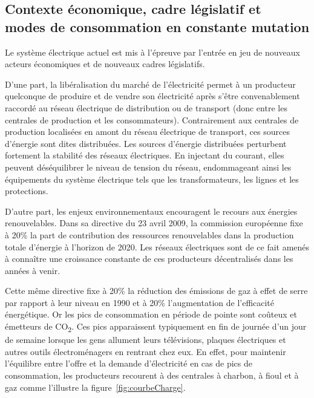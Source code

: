 \subsection{Contexte économique, cadre législatif et\\
modes de consommation en constante mutation}

Le système électrique actuel est mis à l'épreuve par l'entrée en jeu de nouveaux 
acteurs économiques et de nouveaux cadres législatifs. 

D'une part, la libéralisation du marché de l'électricité permet à un producteur 
quelconque de produire et de vendre son électricité après s'être convenablement 
raccordé au réseau électrique de distribution ou de transport (donc entre les 
centrales de production et les consommateurs). Contrairement aux centrales de 
production localisées en amont du réseau électrique de transport, ces sources 
d'énergie sont dites distribuées. Les sources d'énergie distribuées perturbent 
fortement la stabilité des réseaux électriques. En injectant du courant, elles 
peuvent déséquilibrer le niveau de tension du réseau, endommageant ainsi les 
équipements du système électrique tels que les transformateurs, les lignes et 
les protections. 

D'autre part, les enjeux environnementaux encouragent le recours aux énergies 
renouvelables. Dans sa directive du 23 avril 2009, la commission européenne fixe 
à 20\% la part de contribution des ressources renouvelables dans la production 
totale d'énergie à l'horizon de 2020. Les réseaux électriques sont de ce fait 
amenés à connaître une croissance constante de ces producteurs décentralisés 
dans les années à venir.

Cette même directive fixe à 20\% la réduction des émissions de gaz à effet de 
serre par rapport à leur niveau en 1990 et à 20\% l'augmentation de l'efficacité 
énergétique. Or les pics de consommation en période de pointe sont coûteux et 
émetteurs de CO\textsubscript{2}. Ces pics apparaissent typiquement en fin de journée d'un 
jour de semaine lorsque les gens allument leurs télévisions, plaques électriques 
et autres outils électroménagers en rentrant chez eux.  En effet, pour maintenir 
l'équilibre entre l'offre et la demande d'électricité en cas de pics de 
consommation, les producteurs recourent à des centrales à charbon, à fioul et à 
gaz comme l'illustre la figure~\ref{fig:courbeCharge}.


